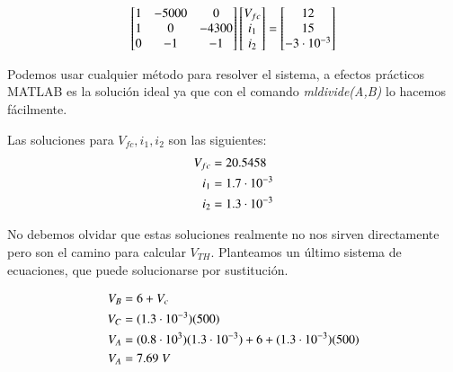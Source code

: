 {       \begin{equation}
         \begin{bmatrix}
           1 & -5000 & 0 \\
           1 & 0 & -4300 \\
           0 & -1 & -1 
         \end{bmatrix}
         \begin{bmatrix}
           V_{fc}\\
           i_1\\
           i_2
         \end{bmatrix}
         =
         \begin{bmatrix}
           12\\
           15\\
           -3 \cdot 10^{-3}
         \end{bmatrix}
       \end{equation}

       Podemos usar cualquier método para resolver el sistema, a
       efectos prácticos \textsc{MATLAB} es la
       solución ideal ya que con el comando
       \textit{mldivide(A,B)} lo hacemos
       fácilmente.

       Las soluciones para $V_{fc},i_1,i_2$
       son las siguientes:
       \begin{equation}
         \begin{split}
           V_{fc}&=20.5458 \\
           i_1&=1.7 \cdot 10^{-3}\\
           i_2&=1.3 \cdot 10^{-3}
           \end{split}
       \end{equation}

       No debemos olvidar que estas soluciones
       realmente no nos sirven directamente pero
       son el camino para calcular $V_{TH}$.
       Planteamos un último sistema de ecuaciones,
       que puede solucionarse por sustitución.

       \begin{equation}
         \begin{split}
           V_B&=6+V_c\\
           V_C &= (1.3 \cdot 10^{-3})(500)\\
           V_A &= (0.8 \cdot 10^{3})(1.3 \cdot 10^{-3})+6+(1.3 \cdot 10^{-3})(500)\\
           V_A &= 7.69 \ V
         \end{split}
       \end{equation}

}
